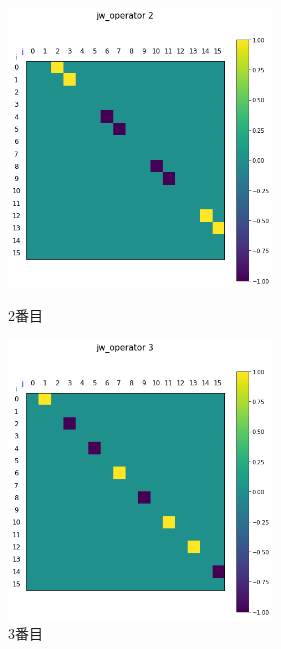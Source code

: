 \documentclass[a4paper, 10pt, dvipdfmx]{jlreq}
\begin{document}
\begin{figure}[htbp]
    \begin{minipage}{0.45\hsize}
        \begin{center}
            \includegraphics[width=70mm]{jw_operators/2.png}
        \end{center}
        \caption{2番目}
    \end{minipage}
    \begin{minipage}{0.45\hsize}
        \begin{center}
            \includegraphics[width=70mm]{jw_operators/3.png}
        \end{center}
        \caption{3番目}
    \end{minipage}
\end{figure}
\end{document}

